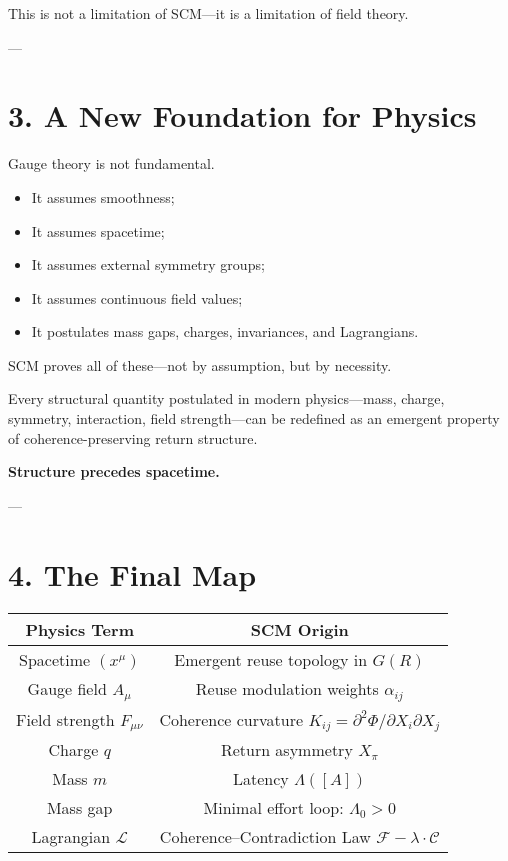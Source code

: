 This is not a limitation of SCM—it is a limitation of field theory.

---

\section{3. A New Foundation for Physics} \label{sec:final-foundation}

Gauge theory is not fundamental.

\begin{itemize}
  \item It assumes smoothness;
  \item It assumes spacetime;
  \item It assumes external symmetry groups;
  \item It assumes continuous field values;
  \item It postulates mass gaps, charges, invariances, and Lagrangians.
\end{itemize}

SCM proves all of these—not by assumption, but by necessity.

\begin{theorem}
Every structural quantity postulated in modern physics—mass, charge, symmetry, interaction, field strength—can be redefined as an emergent property of coherence-preserving return structure.

\textbf{Structure precedes spacetime.}
\end{theorem}

---

\section{4. The Final Map} \label{sec:final-map}

\begin{center}
\begin{tabular}{|c|c|}
\hline
\textbf{Physics Term} & \textbf{SCM Origin} \\
\hline
Spacetime $(x^\mu)$ & Emergent reuse topology in $G(R)$ \\
Gauge field $A_\mu$ & Reuse modulation weights $\alpha_{ij}$ \\
Field strength $F_{\mu\nu}$ & Coherence curvature $K_{ij} = \partial^2 \Phi / \partial X_i \partial X_j$ \\
Charge $q$ & Return asymmetry $X_\pi$ \\
Mass $m$ & Latency $\Lambda([A])$ \\
Mass gap & Minimal effort loop: $\Lambda_0 > 0$ \\
Lagrangian $\mathcal{L}$ & Coherence–Contradiction Law $\mathcal{F} - \lambda \cdot \mathcal{C}$ \\
\hline
\end{tabular}
\end{center}

